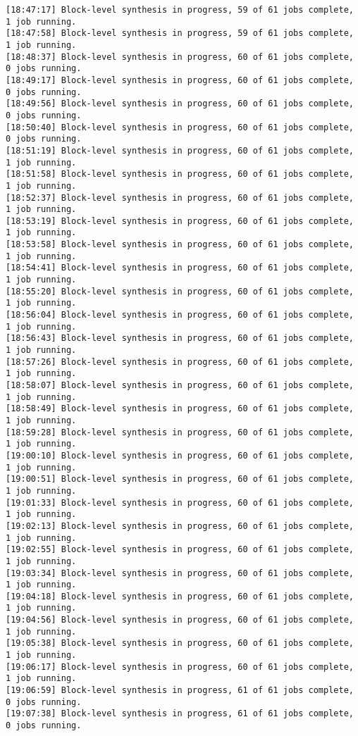 \begin{lstlisting}[label=some-code-2,caption=Содержимое файла v++\_vinc.log]
[18:47:17] Block-level synthesis in progress, 59 of 61 jobs complete, 1 job running.
[18:47:58] Block-level synthesis in progress, 59 of 61 jobs complete, 1 job running.
[18:48:37] Block-level synthesis in progress, 60 of 61 jobs complete, 0 jobs running.
[18:49:17] Block-level synthesis in progress, 60 of 61 jobs complete, 0 jobs running.
[18:49:56] Block-level synthesis in progress, 60 of 61 jobs complete, 0 jobs running.
[18:50:40] Block-level synthesis in progress, 60 of 61 jobs complete, 0 jobs running.
[18:51:19] Block-level synthesis in progress, 60 of 61 jobs complete, 1 job running.
[18:51:58] Block-level synthesis in progress, 60 of 61 jobs complete, 1 job running.
[18:52:37] Block-level synthesis in progress, 60 of 61 jobs complete, 1 job running.
[18:53:19] Block-level synthesis in progress, 60 of 61 jobs complete, 1 job running.
[18:53:58] Block-level synthesis in progress, 60 of 61 jobs complete, 1 job running.
[18:54:41] Block-level synthesis in progress, 60 of 61 jobs complete, 1 job running.
[18:55:20] Block-level synthesis in progress, 60 of 61 jobs complete, 1 job running.
[18:56:04] Block-level synthesis in progress, 60 of 61 jobs complete, 1 job running.
[18:56:43] Block-level synthesis in progress, 60 of 61 jobs complete, 1 job running.
[18:57:26] Block-level synthesis in progress, 60 of 61 jobs complete, 1 job running.
[18:58:07] Block-level synthesis in progress, 60 of 61 jobs complete, 1 job running.
[18:58:49] Block-level synthesis in progress, 60 of 61 jobs complete, 1 job running.
[18:59:28] Block-level synthesis in progress, 60 of 61 jobs complete, 1 job running.
[19:00:10] Block-level synthesis in progress, 60 of 61 jobs complete, 1 job running.
[19:00:51] Block-level synthesis in progress, 60 of 61 jobs complete, 1 job running.
[19:01:33] Block-level synthesis in progress, 60 of 61 jobs complete, 1 job running.
[19:02:13] Block-level synthesis in progress, 60 of 61 jobs complete, 1 job running.
[19:02:55] Block-level synthesis in progress, 60 of 61 jobs complete, 1 job running.
[19:03:34] Block-level synthesis in progress, 60 of 61 jobs complete, 1 job running.
[19:04:18] Block-level synthesis in progress, 60 of 61 jobs complete, 1 job running.
[19:04:56] Block-level synthesis in progress, 60 of 61 jobs complete, 1 job running.
[19:05:38] Block-level synthesis in progress, 60 of 61 jobs complete, 1 job running.
[19:06:17] Block-level synthesis in progress, 60 of 61 jobs complete, 1 job running.
[19:06:59] Block-level synthesis in progress, 61 of 61 jobs complete, 0 jobs running.
[19:07:38] Block-level synthesis in progress, 61 of 61 jobs complete, 0 jobs running.

\end{lstlisting}
